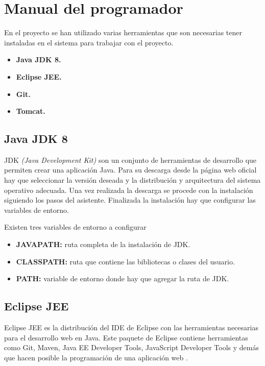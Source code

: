 \section{Manual del programador}

En el proyecto se han utilizado varias herramientas que son necesarias tener instaladas en el sistema para trabajar con el proyecto.

\begin{itemize}
\tightlist
\item \textbf{Java JDK 8.}
\item \textbf{Eclipse JEE.}
\item \textbf{Git.}
\item \textbf{Tomcat.}
\end{itemize}

\subsection{Java JDK 8}

JDK \emph{(Java Development Kit)} son un conjunto de herramientas de desarrollo que permiten crear una aplicación Java. Para su descarga desde la página web oficial \cite{down:jdk} hay que seleccionar la versión deseada y la distribución y arquitectura del sistema operativo adecuada. Una vez realizada la descarga se procede con la instalación siguiendo los pasos del asistente. Finalizada la instalación hay que configurar las variables de entorno. 

Existen tres variables de entorno a configurar \cite{wiki:jdk}

\begin{itemize}
\tightlist
\item \textbf{JAVAPATH:} ruta completa de la instalación de JDK.
\item \textbf{CLASSPATH:} ruta que contiene las bibliotecas o clases del usuario.
\item \textbf{PATH:} variable de entorno donde hay que agregar la ruta de JDK.
\end{itemize}

\subsection{Eclipse JEE}

Eclipse JEE es la distribución del IDE de Eclipse con las herramientas necesarias para el desarrollo web en Java. Este paquete de Eclipse contiene herramientas como Git, Maven, Java EE Developer Tools, JavaScript Developer Tools y demás que hacen posible la programación de una aplicación web \cite{wiki:ecli}.

